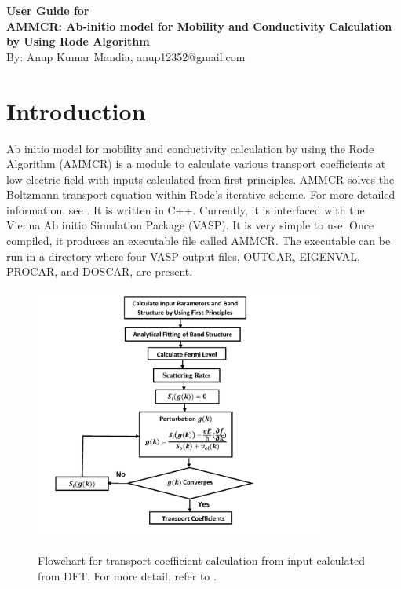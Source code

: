 \documentclass[12pt]{article}
\date{}
\begin{document}
\begin{titlepage}
\begin{center}
\Huge
\textbf{User Guide for \\
AMMCR: Ab-initio model for Mobility and Conductivity Calculation by Using Rode Algorithm\\} 
\vspace{5mm}
\Large 
By: Anup Kumar Mandia, anup12352@gmail.com
\end{center}
\end{titlepage}
  
\tableofcontents

\newpage
  
  
\section{Introduction}
Ab initio model for mobility and conductivity calculation by using the Rode Algorithm (AMMCR) is a module to calculate various transport coefficients at low electric field with inputs calculated from first principles. AMMCR solves the Boltzmann transport equation within Rode's iterative scheme. For more detailed information, see \cite{anup1,anup2,anup3}. It is written in C++. Currently, it is interfaced with the Vienna Ab initio Simulation Package (VASP). It is very simple to use. Once compiled, it produces an executable file called AMMCR. The executable can be run in a directory where four VASP output files, OUTCAR, EIGENVAL, PROCAR, and DOSCAR, are present. \\

\begin{figure}[!t]
	\centering
	{\includegraphics[height=0.85\textwidth,width=0.85\textwidth]{flowchart.pdf}}
	\quad
	\caption{Flowchart for transport coefficient calculation from input calculated from DFT. For more detail, refer to \cite{anup1, anup2, anup3}. }
	\label{flowchart}
\end{figure}
\end{document}
